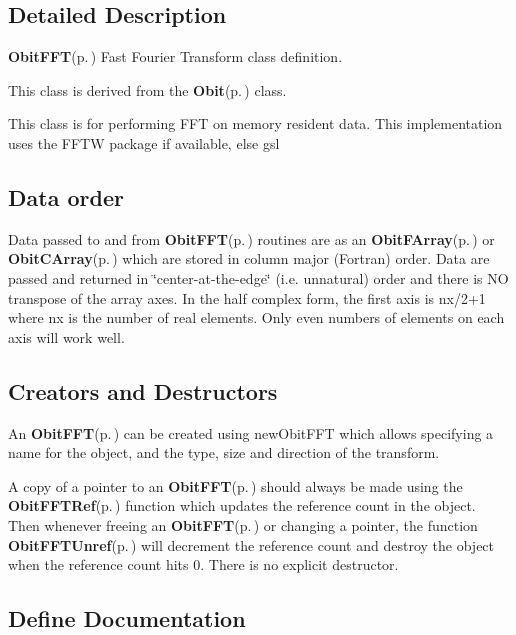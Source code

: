 \subsection{Detailed Description}
{\bf Obit\-FFT}{\rm (p.\,\pageref{structObitFFT})} Fast Fourier Transform class definition. 

This class is derived from the {\bf Obit}{\rm (p.\,\pageref{structObit})} class.

This class is for performing FFT on memory resident data. This implementation uses the FFTW package if available, else gsl\subsection{Data order}\label{ObitFFT_8h_FFTOrder}
Data passed to and from {\bf Obit\-FFT}{\rm (p.\,\pageref{structObitFFT})} routines are as an {\bf Obit\-FArray}{\rm (p.\,\pageref{structObitFArray})} or {\bf Obit\-CArray}{\rm (p.\,\pageref{structObitCArray})} which are stored in column major (Fortran) order. Data are passed and returned in \char`\"{}center-at-the-edge\char`\"{} (i.e. unnatural) order and there is NO transpose of the array axes. In the half complex form, the first axis is nx/2+1 where nx is the number of real elements. Only even numbers of elements on each axis will work well.\subsection{Creators and Destructors}\label{ObitFFT_8h_ObitFFTaccess}
An {\bf Obit\-FFT}{\rm (p.\,\pageref{structObitFFT})} can be created using new\-Obit\-FFT which allows specifying a name for the object, and the type, size and direction of the transform.

A copy of a pointer to an {\bf Obit\-FFT}{\rm (p.\,\pageref{structObitFFT})} should always be made using the {\bf Obit\-FFTRef}{\rm (p.\,\pageref{ObitFFT_8h_a1})} function which updates the reference count in the object. Then whenever freeing an {\bf Obit\-FFT}{\rm (p.\,\pageref{structObitFFT})} or changing a pointer, the function {\bf Obit\-FFTUnref}{\rm (p.\,\pageref{ObitFFT_8h_a0})} will decrement the reference count and destroy the object when the reference count hits 0. There is no explicit destructor.

\subsection{Define Documentation}
